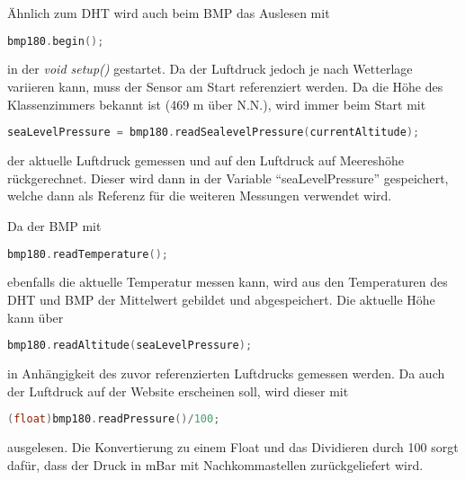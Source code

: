 	Ähnlich zum DHT wird auch beim BMP das Auslesen mit 
\begin{lstlisting}[language=C++]
	bmp180.begin();
\end{lstlisting}
	in der \textit{void setup()} gestartet.
	Da der Luftdruck jedoch je nach Wetterlage variieren kann, muss der Sensor am Start referenziert werden.
	Da die Höhe des Klassenzimmers bekannt ist (469 m über N.N.), wird immer beim Start mit 
\begin{lstlisting}[language=C++]
	seaLevelPressure = bmp180.readSealevelPressure(currentAltitude);
\end{lstlisting}
	der aktuelle Luftdruck gemessen und auf den Luftdruck auf Meereshöhe rückgerechnet. Dieser wird dann in der Variable "`seaLevelPressure"' gespeichert, welche dann als Referenz für die weiteren Messungen verwendet wird.
	
	Da der BMP mit 
\begin{lstlisting}[language=C++]
	bmp180.readTemperature();
\end{lstlisting}
	ebenfalls die aktuelle Temperatur messen kann, wird aus den Temperaturen des DHT und BMP der Mittelwert gebildet und abgespeichert.
	Die aktuelle Höhe kann über 
\begin{lstlisting}[language=C++]
	bmp180.readAltitude(seaLevelPressure);
\end{lstlisting}
	in Anhängigkeit des zuvor referenzierten Luftdrucks gemessen werden.
	Da auch der Luftdruck auf der Website erscheinen soll, wird dieser mit 
\begin{lstlisting}[language=C++]
	(float)bmp180.readPressure()/100;
\end{lstlisting}
	ausgelesen.
	Die Konvertierung zu einem Float und das Dividieren durch 100 sorgt dafür, dass der Druck in mBar mit Nachkommastellen zurückgeliefert wird.

